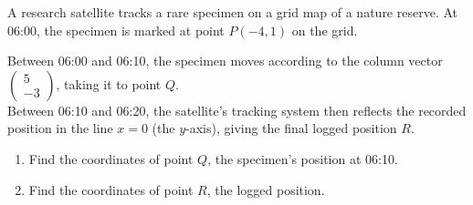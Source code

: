 \begin{question}
\noindent A research satellite tracks a rare specimen on a grid map of a nature reserve.
At 06:00, the specimen is marked at point $P(-4, 1)$ on the grid.

\begin{center}
\end{center}

\noindent Between 06:00 and 06:10, the specimen moves according to the column vector
$\begin{pmatrix} 5 \\ -3 \end{pmatrix}$, taking it to point $Q$.\\
Between 06:10 and 06:20, the satellite's tracking system then reflects the recorded position in the line $x = 0$ (the $y$-axis), giving the final logged position $R$.

\begin{enumerate}
    \item[(a)] Find the coordinates of point $Q$, the specimen's position at 06:10.

    \vspace{3cm}

    \item[(b)] Find the coordinates of point $R$, the logged position.

    \vspace{3.5cm}
\end{enumerate}
\end{question}
